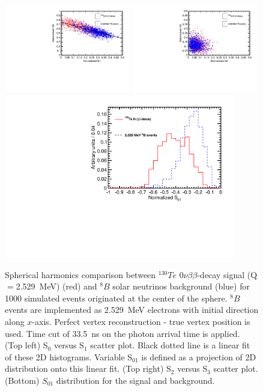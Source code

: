 \documentclass[12pt,twoside,letterpaper]{article}
\newcommand{\vbb}{0\nu\beta\beta}
\newcommand{\Te}{^{130}Te}
\newcommand{\B}{^{8}B}
\begin{document}
\begin{figure}[htb]
\centering
\includegraphics[angle=0,width=0.49\textwidth]{plots/hS0vsS1_Te130_1el_allLight_VtxSmear0cm_VtxShiftX0cm_33p5ns_center.pdf}
\includegraphics[angle=0,width=0.49\textwidth]{plots/hS2vsS3_Te130_1el_allLight_VtxSmear0cm_VtxShiftX0cm_33p5ns_center.pdf}
\includegraphics[angle=0,width=0.9\textwidth]{plots/hS01_allLight_VtxSmear0cm_VtxShiftX0cm_33p5ns_center.pdf}
\caption{Spherical harmonics comparison between $\Te$ $\vbb$-decay signal (Q$=$2.529~MeV) (red) and $\B$ solar neutrinos background (blue) for 1000 simulated events originated at the center of the sphere. $\B$ events are implemented as 2.529~MeV electrons with initial direction along $x$-axis. Perfect vertex reconstruction - true vertex position is used. Time cut of 33.5~ns on the photon arrival time is applied. (Top left) S$_0$ versus S$_1$ scatter plot. Black dotted line is a linear fit of these 2D histograms. Variable S$_{01}$ is defined as a projection of 2D distribution onto this linear fit. (Top right) S$_2$ versus S$_3$ scatter plot. (Bottom) $S_{01}$ distribution for the signal and background.}
\label{fig:SL_Te_33p5ns_center}
\end{figure}
\end{document}
